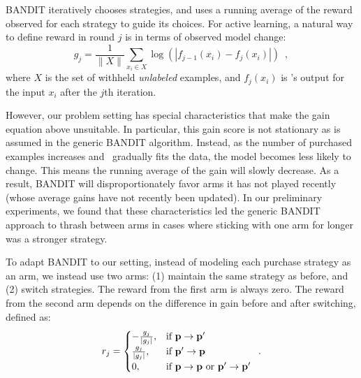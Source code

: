 \documentclass[10pt,conference,compsocconf]{IEEEtran}
\newcommand{\sys}{\Call{Hal}{}} %
\begin{document}
BANDIT iteratively chooses strategies, and uses a running average of the reward observed for each strategy to guide
its choices.  For active learning, a natural way to define reward in round $j$ is in terms of observed model change:
\begin{equation}
g_{j} = \frac{1}{\|X\|}\sum_{x_i \in X} \log{(|f_{j-1}(x_i) - f_{j}(x_i)|)}
\enspace ,
\end{equation}
where $X$ is the set of withheld {\em unlabeled} examples, and $f_{j}(x_i)$ is \sys 's output for the 
input $x_i$ after the $j$th iteration.

However, our problem setting has special characteristics that make the gain equation above unsuitable.
In particular, this gain score is not stationary as is assumed in the generic BANDIT
algorithm. Instead,
as the number of purchased examples increases and \sys\ gradually fits the data, the model becomes less likely to change. 
This means the running average of the gain will slowly decrease.  As a result,
BANDIT will disproportionately favor arms it has not played recently (whose average gains have not recently been updated).
In our preliminary experiments, we found that these characteristics led the generic BANDIT approach to thrash 
between arms in cases where sticking with one arm for longer was a stronger strategy.

To adapt BANDIT to our setting, instead of modeling each purchase strategy as
an arm, we instead use
two arms: (1) maintain the same strategy as before, and (2) switch strategies.
The reward from the first arm is always zero.  The reward from the second arm
depends on the difference in gain before and after switching, defined as:
\vspace{-0.1in}
\begin{equation}
\label{eq:reward}
    r_{j}=
\begin{cases}
   -\frac{g_{j}}{|g_{j}|}, & \text{if } {\bf p}\rightarrow{\bf p'}\\
    \frac{g_{j}}{|g_{j}|}, & \text{if } {\bf p'}\rightarrow{\bf p}\\
    0, & \text{if } {\bf p}\rightarrow{\bf p} \text{ or } {\bf p'}\rightarrow{\bf p'}\\
\end{cases}
\enspace .
\end{equation}


\end{document}
